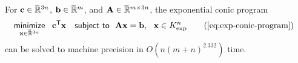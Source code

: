 \documentclass[twoside]{article}
\begin{document}
\begin{lemma}
    For $\mathbf{c} \in \mskip1mu\overline{\mskip-1mu\mathbb R\!}\,^{3n}$, $\mathbf{b} \in \mskip1mu\overline{\mskip-1mu\mathbb R\!}\,^m$, and $\mathbf{A} \in \mskip1mu\overline{\mskip-1mu\mathbb R\!}\,^{m \times 3n}$,
    the exponential conic program
    \begin{align*}
        &\mathop{\text{\sf minimize}}\limits_{\mat x \in \Rext^{3n}}~~ \mat c^{\sf T} \mat x
        \quad\text{\sf subject to}~~ \mat A \mat x = \mat b,~~\mat x \in K_{\exp}^n
        \tag{\ref{eq:exp-conic-program}}
    \end{align*}
    can be 
    solved to machine precision
    in $O(n (m+n)^{2.332}
    )$ time.     
\end{lemma}
\end{document}
